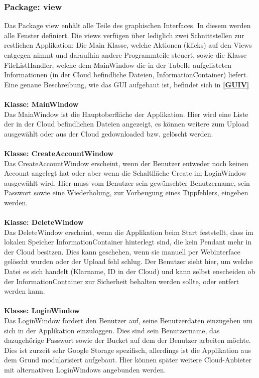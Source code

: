 \documentclass[13pt,a4paper,bibliography=totocnumbered,listof=totocnumbered]{scrartcl}
\newcommand*{\fullref}[1]{\textbf{\hyperref[{#1}]{\ref*{#1} \nameref*{#1}}}}
\begin{document}
\subsubsection{Package: view}
Das Package view enhält alle Teile des graphischen Interfaces. In diesem werden alle Fenster definiert. Die views verfügen über lediglich zwei Schnittstellen zur restlichen Applikation: Die Main Klasse, welche Aktionen (klicks) auf den Views entgegen nimmt und daraufhin andere Programmteile steuert, sowie die Klasse FileListHandler, welche dem MainWindow die in der Tabelle aufgelisteten Informationen (in der Cloud befindliche Dateien, InformationContainer) liefert. Eine genaue Beschreibung, wie das GUI aufgebaut ist, befindet sich in \fullref{GUIV}\\\\
\textbf{Klasse: MainWindow}\\
Das MainWindow ist die Hauptoberfläche der Applikation. Hier wird eine Liste der in der Cloud befindlichen Dateien angezeigt, es können weitere zum Upload ausgewählt oder aus der Cloud gedownloaded bzw. gelöscht werden.\\\\
\textbf{Klasse: CreateAccountWindow}\\
Das CreateAccountWindow erscheint, wenn der Benutzer entweder noch keinen Account angelegt hat oder aber wenn die Schaltfläche Create im LoginWindow ausgewählt wird. Hier muss vom Benutzer sein gewünschter Benutzername, sein Passwort sowie eine Wiederholung, zur Vorbeugung eines Tippfehlers, eingeben werden.\\\\
\textbf{Klasse: DeleteWindow}\\
Das DeleteWindow erscheint, wenn die Applikation beim Start feststellt, dass im lokalen Speicher InformationContainer hinterlegt sind, die kein Pendant mehr in der Cloud besitzen. Dies kann geschehen, wenn sie manuell per Webinterface gelöscht wurden oder der Upload fehl schlug. Der Benutzer sieht hier, um welche Datei es sich handelt (Klarname, ID in der Cloud) und kann selbst enscheiden ob der InformationContainer zur Sicherheit behalten werden sollte, oder entfert werden kann.\\\\
\textbf{Klasse: LoginWindow}\\
Das LoginWindow fordert den Benutzer auf, seine Benutzerdaten einzugeben um sich in der Applikation einzuloggen. Dies sind sein Benutzername, das dazugehörige Passwort sowie der Bucket auf dem der Benutzer arbeiten möchte. Dies ist zurzeit sehr Google Storage spezifisch, allerdings ist die Applikation aus dem Grund modularisiert aufgebaut. Hier können später weitere Cloud-Anbieter mit alternativen LoginWindows angebunden werden.\\\\
\end{document}
